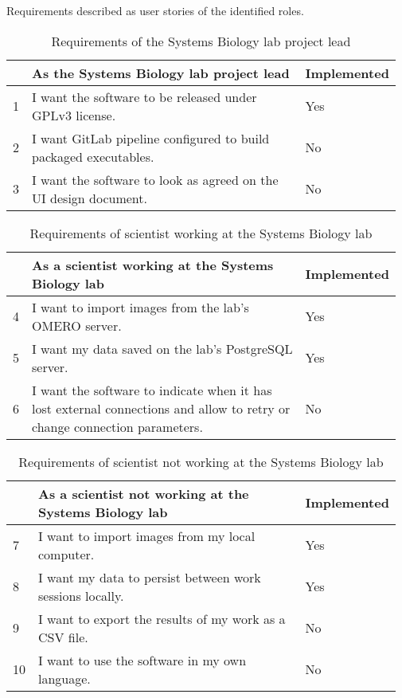 Requirements described as user stories of the identified roles.

\begin{table}[h!]
\small
\begin{tabular}{|p{0.02\linewidth}|p{0.80\linewidth}|p{0.15\linewidth}|}
\hline
   & \textbf{As the Systems Biology lab project lead} & \textbf{Implemented} \\
\hline
1 & I want the software to be released under GPLv3 license. & Yes\\ \hline
2 & I want GitLab pipeline configured to build packaged executables. & No\\ \hline
3 & I want the software to look as agreed on the UI design document. & No\\ \hline
\end{tabular}
\caption{Requirements of the Systems Biology lab project lead}\label{table:requirements-lead}
\end{table}

\begin{table}[h!]
\small
\begin{tabular}{|p{0.02\linewidth}|p{0.80\linewidth}|p{0.15\linewidth}|}
\hline
   & \textbf{As a scientist working at the Systems Biology lab} & \textbf{Implemented} \\
\hline 
4 & I want to import images from the lab’s OMERO server. & Yes\\ \hline
5 & I want my data saved on the lab’s PostgreSQL server. & Yes\\ \hline
6 & I want the software to indicate when it has lost external connections and allow to retry or change connection parameters. & No\\ \hline
\end{tabular}
\caption{Requirements of scientist working at the Systems Biology lab}\label{table:requirements-scientist-iocbio}
\end{table}

\begin{table}[h!]
\small
\begin{tabular}{|p{0.02\linewidth}|p{0.80\linewidth}|p{0.15\linewidth}|}
\hline
   & \textbf{As a scientist not working at the Systems Biology lab} & \textbf{Implemented}   \\ 
\hline
7 & I want to import images from my local computer. & Yes\\ \hline
8 & I want my data to persist between work sessions locally. & Yes\\ \hline
9 & I want to export the results of my work as a CSV file. & No\\ \hline
10 & I want to use the software in my own language. & No\\ \hline
\end{tabular}
\caption{Requirements of scientist not working at the Systems Biology lab}\label{table:requirements-scientist-not-iocbio}
\end{table}

